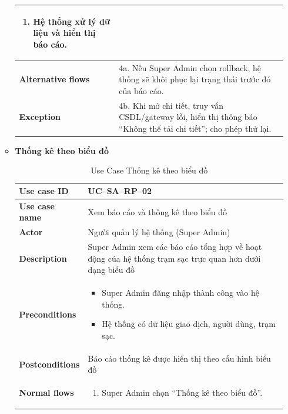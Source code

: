 \begin{enumerate}[label=\textbf{\alph*)}]
\begin{itemize}
\begin{center}
\begin{longtable}{|m{}|m{}|}
\begin{enumerate}[label=\arabic*.]
            \item Hệ thống xử lý dữ liệu và hiển thị báo cáo.
          \end{enumerate}\\
          \hline
          \textbf{Alternative flows} &
          4a. Nếu Super Admin chọn rollback, hệ thống sẽ khôi phục lại trạng thái trước đó của báo cáo.\\
          \hline
          \textbf{Exception} &
          4b. Khi mở chi tiết, truy vấn CSDL/gateway lỗi,  hiển thị thông báo “Không thể tải chi tiết”; cho phép thử lại.\\
          \hline
          \end{longtable}
      \end{center}
    \item \textbf{Thống kê theo biểu đồ}
      \begin{center}
        \renewcommand{\arraystretch}{1.5}
        \begin{longtable}{|m{}|m{}|}
          \caption{Use Case Thống kê theo biểu đồ}
          \label{tab:uc_sa_rp_02} \\
          \hline
          \textbf{Use case ID} & UC--SA--RP--02 \\
          \hline
          \textbf{Use case name} & Xem báo cáo và thống kê theo biểu đồ \\
          \hline
          \textbf{Actor} & Người quản lý hệ thống (Super Admin) \\
          \hline
          \textbf{Description} & Super Admin xem các báo cáo tổng hợp về hoạt động của hệ thống trạm sạc trực quan hơn dưới dạng biểu đồ\\
          \hline
          \textbf{Preconditions} &
          \begin{itemize}
            \item Super Admin đăng nhập thành công vào hệ thống.
            \item Hệ thống có dữ liệu giao dịch, người dùng, trạm sạc.
          \end{itemize}\\
          \hline
          \textbf{Postconditions} &
          Báo cáo thống kê được hiển thị theo cấu hình biểu đồ\\
          \hline
          \textbf{Normal flows} &
          \begin{enumerate}[label=\arabic*.]
            \item Super Admin chọn “Thống kê theo biểu đồ”.

\end{enumerate}
\end{longtable}
\end{center}
\end{itemize}
\end{enumerate}
